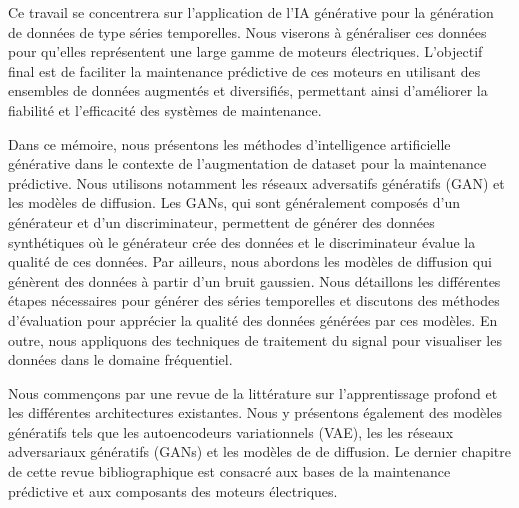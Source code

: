 \medskip
Ce travail se concentrera sur l'application de l'IA générative pour la génération de
données de type séries temporelles. Nous viserons à généraliser ces données pour qu'elles
représentent une large gamme de moteurs électriques. L'objectif final est de faciliter la
maintenance prédictive de ces moteurs en utilisant des ensembles de données augmentés et diversifiés,
permettant ainsi d'améliorer la fiabilité et l'efficacité des systèmes de maintenance.

\medskip

Dans ce mémoire, nous présentons les méthodes d'intelligence artificielle
générative dans le contexte de l'augmentation de dataset pour la maintenance
prédictive. Nous utilisons notamment les réseaux adversatifs génératifs (GAN)
et les modèles de diffusion. Les GANs, qui sont généralement composés d'un
générateur et d'un discriminateur, permettent de générer des données
synthétiques où le générateur crée des données et le discriminateur évalue la
qualité de ces données. Par ailleurs, nous abordons les modèles de diffusion
qui génèrent des données à partir d'un bruit gaussien. Nous détaillons les
différentes étapes nécessaires pour générer des séries temporelles et discutons
des méthodes d'évaluation pour apprécier la qualité des données générées par
ces modèles. En outre, nous appliquons des techniques de traitement du signal
pour visualiser les données dans le domaine fréquentiel.

\medskip
Nous commençons par une revue de la littérature sur l'apprentissage profond et
les différentes architectures existantes. Nous y présentons également des modèles
génératifs tels que les autoencodeurs variationnels (VAE), les les réseaux adversariaux génératifs (GANs) et les modèles de
de diffusion. Le dernier chapitre de cette revue bibliographique est
consacré aux bases de la maintenance prédictive et aux composants des moteurs
électriques.

